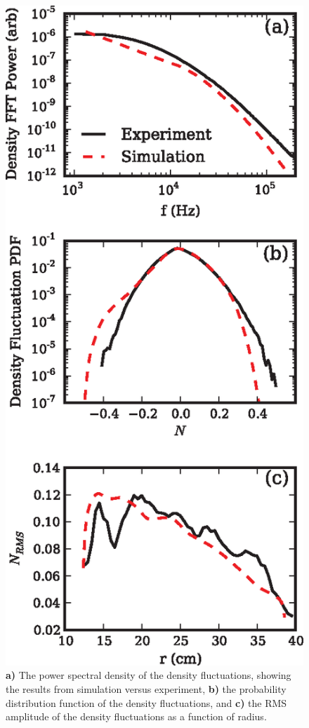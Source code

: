 \documentclass[showpacs,preprintnumbers,amsmath,amssymb,superscriptaddress,aip]{revtex4-1}
\begin{document}
\begin{figure}[!htbp]
\includegraphics[]{statistics}
\hfil
\caption{\textbf{a)} The power spectral density of the density fluctuations, showing the results from simulation versus experiment, \textbf{b)} the probability distribution function
of the density fluctuations, and \textbf{c)} the RMS amplitude of the density fluctuations as a function of radius.}
\label{validation}
\end{figure}
\end{document}

